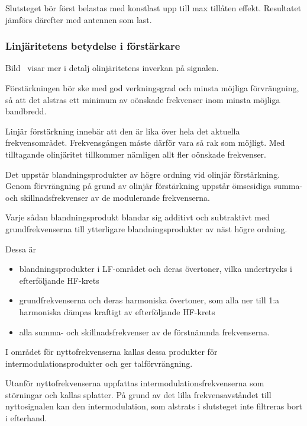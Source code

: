Slutsteget bör först belastas med konstlast upp till max tillåten effekt.
Resultatet jämförs därefter med antennen som last.

\newpage
\subsubsection{Linjäritetens betydelse i förstärkare}


Bild~ visar mer i detalj olinjäritetens inverkan på
signalen.

Förstärkningen bör ske med god verkningsgrad och minsta möjliga förvrängning,
så att det alstras ett minimum av oönskade frekvenser inom minsta möjliga
bandbredd.

Linjär förstärkning innebär att den är lika över hela det aktuella
frekvensområdet.
Frekvensgången måste därför vara så rak som möjligt.
Med tilltagande olinjäritet tillkommer nämligen allt fler oönskade frekvenser.

Det uppstår blandningsprodukter av högre ordning vid olinjär förstärkning.
Genom förvrängning på grund av olinjär förstärkning uppstår ömsesidiga summa-
och skillnadsfrekvenser av de modulerande frekvenserna.

Varje sådan blandningsprodukt blandar sig additivt och subtraktivt med
grundfrekvenserna till ytterligare blandningsprodukter av näst högre ordning.

Dessa är
\begin{itemize}
\item blandningsprodukter i LF-området och deras övertoner, vilka
  undertrycks i efterföljande HF-krets

\item grundfrekvenserna och deras harmoniska övertoner, som alla ner
  till 1:a harmoniska dämpas kraftigt av efterföljande HF-krets

\item alla summa- och skillnadsfrekvenser av de förstnämnda frekvenserna.
\end{itemize}

I området för nyttofrekvenserna kallas dessa produkter för
intermodulationsprodukter och ger talförvrängning.

Utanför nyttofrekvenserna uppfattas intermodulationsfrekvenserna som
störningar och kallas splatter.
På grund av det lilla frekvensavståndet till nyttosignalen kan den
intermodulation, som alstrats i slutsteget inte filtreras bort i efterhand.

